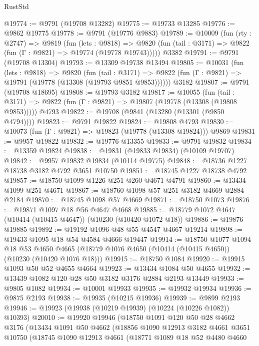 \begin{lexlean}{RustStd}
\begin{coremodule}
@19774 := @9791 (@19708 @13282)
@19775 := @19733 @13285
@19776 := @9862 @19775
@19778 := @9791 (@19776 @9883)
@19789 := @10009
    (fun (rty : @2747) =>
    @9819
      (fun (lets : @9818) =>
      @9820 (fun (tail : @3171) => @9822 (fun (Γ : @9821) => @19774 (@19778 @19743)))))
    @3382
@19791 := @9791 (@19708 @13304)
@19793 := @13309 @19738 @13494
@19805 := @10031
    (fun (lets : @9818) =>
    @9820
      (fun (tail : @3171) =>
      @9822 (fun (Γ : @9821) => @19791 (@19778 (@13308 (@19793 @9851 @9853))))))
    @3182
@19807 := @9791 (@19708 @18695)
@19808 := @19793 @3182
@19817 := @10055
    (fun (tail : @3171) => @9822 (fun (Γ : @9821) => @19807 (@19778 (@13308 (@19808 @9853)))))
    @4793
@19822 := @19708 (@9841 (@13280 (@13301 (@9850 @4794))))
@19823 := @9791 @19822
@19824 := @19808 @4793
@19830 := @10073 (fun (Γ : @9821) => @19823 (@19778 (@13308 @19824))) @9869
@19831 := @9957 @19822
@19832 := @19776 @13355
@19833 := @9791 @19832
@19834 := @13359 @19824
@19838 := @19831 (@19833 @19834) (@10109 @19707)
@19842 := @9957 @19832 @19834 (@10114 @19775)
@19848 := @18736 @1227 @18738 @3182 @4792 @3651 @10750
@19851 := @18745 @1227 @18738 @4792
@19857 := @18750 @1099 @1226 @251 @260 @4671 @4791
@19860 := @13434 @1099 @251 @4671
@19867 := @18760 @1098 @57 @251 @3182 @4669 @2884 @2184
@19870 := @18745 @1098 @57 @4669
@19871 := @18750 @1073
@19876 := @19871 @1097 @18 @56 @4647 @4668
@19885 := @18779 @1072 @4647 (@10414 (@10415 @4647)) (@10230 (@10420 @1072 @18))
@19886 := @19876 @19885
@19892 := @19192 @1096 @48 @55 @4547 @4667 @19214
@19898 := @19433 @1095 @18 @54 @4584 @4666 @19447
@19914 := @18750
    @1077
    @1094
    @18
    @53
    @4650
    @4665
    (@18779 @1076 @4650 (@10414 (@10415 @4650)) (@10230 (@10420 @1076 @18)))
@19915 := @18750 @1084
@19920 := @19915 @1093 @50 @52 @4655 @4664
@19923 := @13434 @1084 @50 @4655
@19932 := @13439 @1082 @120 @28 @50 @3182 @3176 @2884 @2193 @13449
@19933 := @9805 @1082
@19934 := @10001 @19933
@19935 := @19932 @19934
@19936 := @9875 @2193
@19938 := @19935 (@10215 @19936)
@19939 := @9899 @2193
@19946 := @19923 (@19938 (@10219 @19939) (@10224 (@10226 @1082)) @10393)
@20010 := @19920
    @19946
    (@18750
      @1091
      @120
      @50
      @28
      @4662
      @3176
      (@13434
        @1091
        @50
        @4662
        (@18856
          @1090
          @12913
          @3182
          @4661
          @3651
          @10750
          (@18745
            @1090
            @12913
            @4661
            (@18771
              @1089
              @18
              @52
              @4480
              @4660

\end{coremodule}
\end{lexlean}
